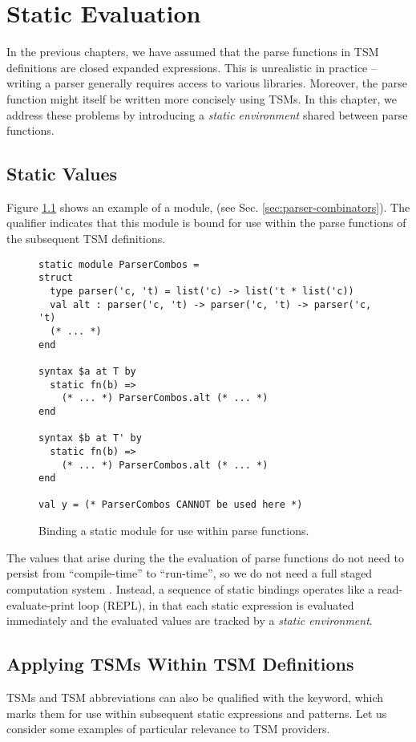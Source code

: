 \chapter{Static Evaluation}\label{chap:static-eval}
In the previous chapters, we have assumed that the parse functions in TSM definitions are closed expanded expressions. This is unrealistic in practice -- writing a parser generally requires access to various libraries. Moreover, the parse function might itself be written more concisely using TSMs. In this chapter, we address these problems by introducing a \emph{static environment} shared between parse functions.

\section{Static Values}
Figure \ref{fig:static-module-example} shows an example of a module,  (see Sec. \ref{sec:parser-combinators}). The  qualifier indicates that this module is bound for use within the parse functions of the subsequent TSM definitions.
\begin{figure}[h]
\begin{lstlisting}
static module ParserCombos = 
struct 
  type parser('c, 't) = list('c) -> list('t * list('c))
  val alt : parser('c, 't) -> parser('c, 't) -> parser('c, 't)
  (* ... *)
end

syntax $a at T by 
  static fn(b) => 
  	(* ... *) ParserCombos.alt (* ... *)
end

syntax $b at T' by 
  static fn(b) => 
    (* ... *) ParserCombos.alt (* ... *)
end

val y = (* ParserCombos CANNOT be used here *)
\end{lstlisting}
\caption{Binding a static module for use within parse functions.}
\label{fig:static-module-example}
\end{figure}
\clearpage

The values that arise during the the evaluation of parse functions do not need to persist from ``compile-time'' to ``run-time'', so we do not need a full staged computation system \cite{Taha99multi-stageprogramming:}. Instead, a sequence of static bindings operates like a read-evaluate-print loop (REPL), in that each static expression is evaluated immediately and the evaluated values are tracked by a \emph{static environment}.


\section{Applying TSMs Within TSM Definitions}\label{sec:tsms-for-tsms}
TSMs and TSM abbreviations can also be qualified with the  keyword, which marks them for use within subsequent static expressions and patterns. Let us consider some examples of particular relevance to TSM providers.

